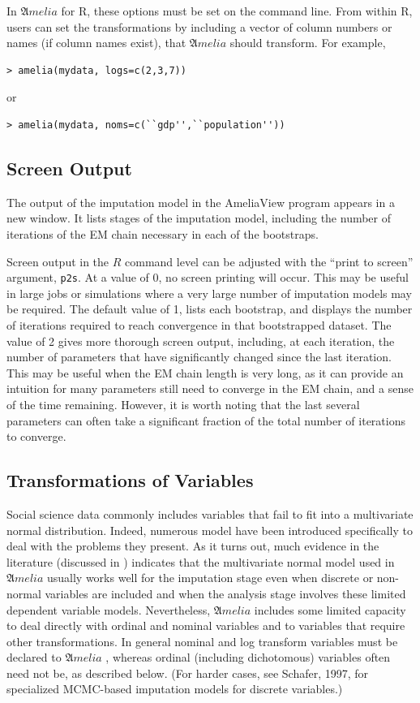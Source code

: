 \documentclass[12pt,titlepage]{article}
\newcommand{\Amelia}{\ensuremath{\mathfrak Amelia} }
\begin{document}
In \Amelia for R, these options must be set on the command line.  From
within R, users can set the transformations by including a vector of
column numbers or names (if column names exist), that \Amelia should
transform.  For example,

\begin{verbatim}
> amelia(mydata, logs=c(2,3,7))
\end{verbatim}
or
\begin{verbatim}
> amelia(mydata, noms=c(``gdp'',``population''))
\end{verbatim}

\subsection{Screen Output}
The output of the imputation model in the AmeliaView program appears
in a new window.  It lists stages of the imputation model, including
the number of iterations of the EM chain necessary in each of the
bootstraps.

Screen output in the $R$ command level can be adjusted with the
``print to screen'' argument, \texttt{p2s}.  At a value of 0, no
screen printing will occur.  This may be useful in large jobs or
simulations where a very large number of imputation models may be
required.  The default value of 1, lists each bootstrap, and displays
the number of iterations required to reach convergence in that
bootstrapped dataset.  The value of 2 gives more thorough screen
output, including, at each iteration, the number of parameters that
have significantly changed since the last iteration.  This may be
useful when the EM chain length is very long, as it can provide an
intuition for many parameters still need to converge in the EM chain,
and a sense of the time remaining.  However, it is worth noting that
the last several parameters can often take a significant fraction of
the total number of iterations to converge.

\subsection{Transformations of Variables}
\label{sec:trans}

Social science data commonly includes variables that fail to fit into
a multivariate normal distribution. Indeed, numerous model have been
introduced specifically to deal with the problems they present.  As it
turns out, much evidence in the literature (discussed in
\citealt{KinHonJos01}) indicates that the multivariate normal model
used in ${\mathfrak Amelia}$ usually works well for the imputation
stage even when discrete or non-normal variables are included and when
the analysis stage involves these limited dependent variable models.
Nevertheless, ${\mathfrak Amelia}$ includes some limited capacity to
deal directly with ordinal and nominal variables and to variables that
require other transformations.  In general nominal and log transform
variables must be declared to \Amelia, whereas ordinal (including
dichotomous) variables often need not be, as described below.  (For
harder cases, see Schafer, 1997, for specialized MCMC-based imputation
models for discrete variables.)\nocite{KinHonJos01}
\end{document}
